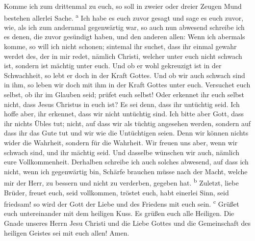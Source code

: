  Komme ich zum drittenmal zu euch, so soll in zweier oder
dreier Zeugen Mund bestehen allerlei Sache. \textsuperscript{a}
 Ich habe es euch zuvor gesagt und sage es euch zuvor,
wie, als ich zum andernmal gegenwärtig war, so auch nun abwesend
schreibe ich es denen, die zuvor gesündigt haben, und den anderen allen:
Wenn ich abermals komme, so will ich nicht schonen; 
sintemal ihr suchet, dass ihr einmal gewahr werdet des, der in mir
redet, nämlich Christi, welcher unter euch nicht schwach ist, sondern
ist mächtig unter euch.  Und ob er wohl gekreuzigt ist in
der Schwachheit, so lebt er doch in der Kraft Gottes. Und ob wir auch
schwach sind in ihm, so leben wir doch mit ihm in der Kraft Gottes unter
euch.  Versuchet euch selbst, ob ihr im Glauben seid;
prüfet euch selbst! Oder erkennet ihr euch selbst nicht, dass Jesus
Christus in euch ist? Es sei denn, dass ihr untüchtig seid.
 Ich hoffe aber, ihr erkennet, dass wir nicht untüchtig
sind.  Ich bitte aber Gott, dass ihr nichts Übles tut;
nicht, auf dass wir als tüchtig angesehen werden, sondern auf dass ihr
das Gute tut und wir wie die Untüchtigen seien.  Denn wir
können nichts wider die Wahrheit, sondern für die Wahrheit.
 Wir freuen uns aber, wenn wir schwach sind, und ihr
mächtig seid. Und dasselbe wünschen wir auch, nämlich eure
Vollkommenheit.  Derhalben schreibe ich auch solches
abwesend, auf dass ich nicht, wenn ich gegenwärtig bin, Schärfe brauchen
müsse nach der Macht, welche mir der Herr, zu bessern und nicht zu
verderben, gegeben hat. \textsuperscript{b}  Zuletzt,
liebe Brüder, freuet euch, seid vollkommen, tröstet euch, habt einerlei
Sinn, seid friedsam! so wird der Gott der Liebe und des Friedens mit
euch sein. \textsuperscript{c}  Grüßet euch untereinander
mit dem heiligen Kuss. Es grüßen euch alle Heiligen.  Die
Gnade unseres Herrn Jesu Christi und die Liebe Gottes und die
Gemeinschaft des heiligen Geistes sei mit euch allen! Amen.
